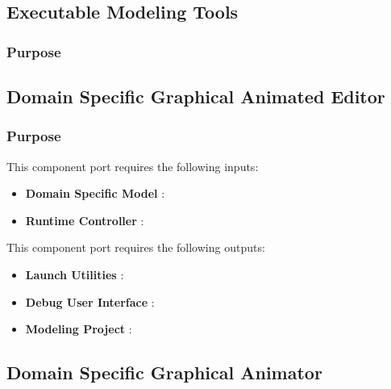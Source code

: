 \documentclass{gemoc} %
\begin{document}
\subsection{Executable Modeling Tools}


\subsubsection{Purpose}



\subsection{Domain Specific Graphical Animated Editor}


\subsubsection{Purpose}

This component port requires the following inputs:
\begin{itemize}
  \item \textbf{Domain Specific Model} :
  \item \textbf{Runtime Controller} :
\end{itemize}

This component port requires the following outputs:
\begin{itemize}
  \item \textbf{Launch Utilities} :
  \item \textbf{Debug User Interface} :
  \item \textbf{Modeling Project} :
\end{itemize}

\subsection{Domain Specific Graphical Animator}
\end{document}
